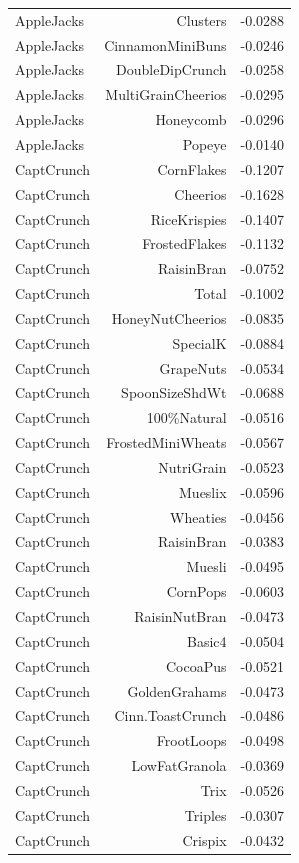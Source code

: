 \begin{longtable}{@{}lrr@{}}
AppleJacks & Clusters & -0.0288 \\
AppleJacks & CinnamonMiniBuns & -0.0246 \\
AppleJacks & DoubleDipCrunch & -0.0258 \\
AppleJacks & MultiGrainCheerios & -0.0295 \\
AppleJacks & Honeycomb & -0.0296 \\
AppleJacks & Popeye & -0.0140 \\
CaptCrunch & CornFlakes & -0.1207 \\
CaptCrunch & Cheerios & -0.1628 \\
CaptCrunch & RiceKrispies & -0.1407 \\
CaptCrunch & FrostedFlakes & -0.1132 \\
CaptCrunch & RaisinBran & -0.0752 \\
CaptCrunch & Total & -0.1002 \\
CaptCrunch & HoneyNutCheerios & -0.0835 \\
CaptCrunch & SpecialK & -0.0884 \\
CaptCrunch & GrapeNuts & -0.0534 \\
CaptCrunch & SpoonSizeShdWt & -0.0688 \\
CaptCrunch & 100\%Natural & -0.0516 \\
CaptCrunch & FrostedMiniWheats & -0.0567 \\
CaptCrunch & NutriGrain & -0.0523 \\
CaptCrunch & Mueslix & -0.0596 \\
CaptCrunch & Wheaties & -0.0456 \\
CaptCrunch & RaisinBran & -0.0383 \\
CaptCrunch & Muesli & -0.0495 \\
CaptCrunch & CornPops & -0.0603 \\
CaptCrunch & RaisinNutBran & -0.0473 \\
CaptCrunch & Basic4 & -0.0504 \\
CaptCrunch & CocoaPus & -0.0521 \\
CaptCrunch & GoldenGrahams & -0.0473 \\
CaptCrunch & Cinn.ToastCrunch & -0.0486 \\
CaptCrunch & FrootLoops & -0.0498 \\
CaptCrunch & LowFatGranola & -0.0369 \\
CaptCrunch & Trix & -0.0526 \\
CaptCrunch & Triples & -0.0307 \\
CaptCrunch & Crispix & -0.0432 \\

\end{longtable}
